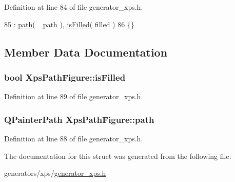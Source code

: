 Definition at line 84 of file generator\+\_\+xps.\+h.


\begin{DoxyCode}
85         : \hyperlink{structXpsPathFigure_a838158781b3fff2e2125b6379fa1f62f}{path}( \_path ), \hyperlink{structXpsPathFigure_a814e70bb5067df634922919ee1854abe}{isFilled}( filled )
86     \{\}
\end{DoxyCode}


\subsection{Member Data Documentation}
\hypertarget{structXpsPathFigure_a814e70bb5067df634922919ee1854abe}{
\subsubsection[{is\+Filled}]{\setlength{\rightskip}{0pt plus 5cm}bool Xps\+Path\+Figure\+::is\+Filled}}\label{structXpsPathFigure_a814e70bb5067df634922919ee1854abe}


Definition at line 89 of file generator\+\_\+xps.\+h.

\hypertarget{structXpsPathFigure_a838158781b3fff2e2125b6379fa1f62f}{
\subsubsection[{path}]{\setlength{\rightskip}{0pt plus 5cm}Q\+Painter\+Path Xps\+Path\+Figure\+::path}}\label{structXpsPathFigure_a838158781b3fff2e2125b6379fa1f62f}


Definition at line 88 of file generator\+\_\+xps.\+h.



The documentation for this struct was generated from the following file\+:\begin{DoxyCompactItemize}
\item 
generators/xps/\hyperlink{generator__xps_8h}{generator\+\_\+xps.\+h}\end{DoxyCompactItemize}
